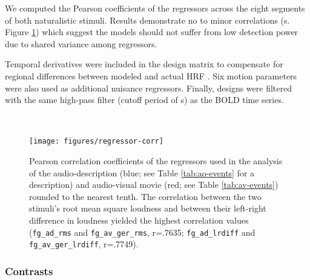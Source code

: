 \documentclass[english]{article}
\begin{document}
We computed the Pearson coefficients of the regressors across the eight segments
of both naturalistic stimuli. Results demonstrate no to minor correlations (s.
Figure \ref{fig:reg-corr}) which suggest the models should not suffer from low
detection power due to shared variance among regressors.
%


Temporal derivatives were included in the design matrix to compensate for
regional differences between modeled and actual HRF \citep{friston1998event}.
Six motion parameters were also used as additional nuisance regressors.
Finally, designs were filtered with the same high-pass filter (cutoff period of
\unit[150]{s}) as the BOLD time series.





\begin{figure} \centering
    \texttt{[image: figures/regressor-corr]} \caption{Pearson
        correlation coefficients  of the regressors used in the analysis of the
        audio-description (blue; see Table \ref{tab:ao-events} for a
        description) and audio-visual movie (red; see Table \ref{tab:av-events})
        rounded to the nearest tenth.  The correlation between the two stimuli's
        root mean square loudness and between their left-right difference in
        loudness yielded the highest correlation values
        (\texttt{fg\_ad\_rms} and \texttt{fg\_av\_ger\_rms}, r=.7635;
        \texttt{fg\_ad\_lrdiff} and \texttt{fg\_av\_ger\_lrdiff}, r=.7749).}
\label{fig:reg-corr}
\end{figure}


\subsubsection{Contrasts}
\end{document}
